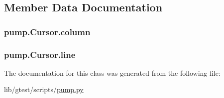 \subsection{Member Data Documentation}
\hypertarget{classpump_1_1_cursor_ae73db76c3a845a82afb334633864254e}{
\subsubsection[{column}]{\setlength{\rightskip}{0pt plus 5cm}pump.\-Cursor.\-column}}\label{classpump_1_1_cursor_ae73db76c3a845a82afb334633864254e}
\hypertarget{classpump_1_1_cursor_aee8d8b67360da7fc4e635540cb41d48c}{
\subsubsection[{line}]{\setlength{\rightskip}{0pt plus 5cm}pump.\-Cursor.\-line}}\label{classpump_1_1_cursor_aee8d8b67360da7fc4e635540cb41d48c}


The documentation for this class was generated from the following file\-:\begin{DoxyCompactItemize}
\item 
lib/gtest/scripts/\hyperlink{pump_8py}{pump.\-py}\end{DoxyCompactItemize}
